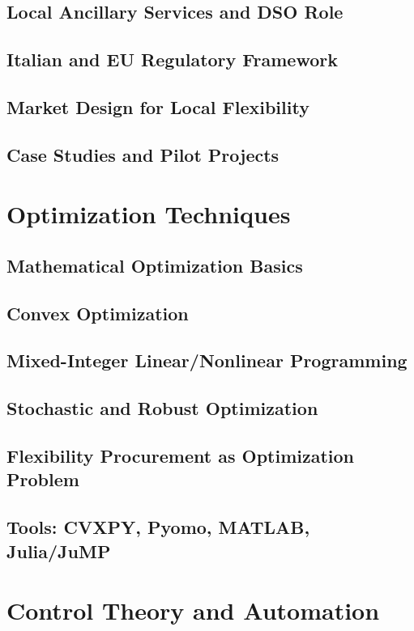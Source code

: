 \documentclass[11pt]{article}
\begin{document}
	\subsection{Local Ancillary Services and DSO Role}
	\subsection{Italian and EU Regulatory Framework}
	\subsection{Market Design for Local Flexibility}
	\subsection{Case Studies and Pilot Projects}
	
	\section{Optimization Techniques}
	\subsection{Mathematical Optimization Basics}
	\subsection{Convex Optimization}
	\subsection{Mixed-Integer Linear/Nonlinear Programming}
	\subsection{Stochastic and Robust Optimization}
	\subsection{Flexibility Procurement as Optimization Problem}
	\subsection{Tools: CVXPY, Pyomo, MATLAB, Julia/JuMP}
	
	\section{Control Theory and Automation}
\end{document}
